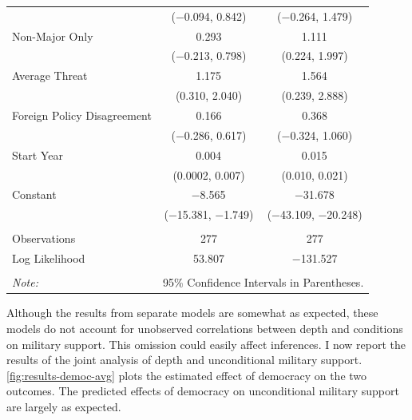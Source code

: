 \documentclass[12pt]{article}
\begin{document}
\begin{table}[!htbp]
\begin{tabular}{@{\extracolsep{5pt}}lcc}
  & ($-$0.094, 0.842) & ($-$0.264, 1.479) \\ 
  Non-Major Only & 0.293 & 1.111$^{}$ \\ 
  & ($-$0.213, 0.798) & (0.224, 1.997) \\ 
  Average Threat & 1.175$^{}$ & 1.564$^{}$ \\ 
  & (0.310, 2.040) & (0.239, 2.888) \\ 
  Foreign Policy Disagreement & 0.166 & 0.368 \\ 
  & ($-$0.286, 0.617) & ($-$0.324, 1.060) \\ 
  Start Year & 0.004$^{}$ & 0.015$^{}$ \\ 
  & (0.0002, 0.007) & (0.010, 0.021) \\ 
  Constant & $-$8.565$^{}$ & $-$31.678$^{}$ \\ 
  & ($-$15.381, $-$1.749) & ($-$43.109, $-$20.248) \\ 
 \hline \\[-1.8ex] 
Observations & 277 & 277 \\ 
Log Likelihood & 53.807 & $-$131.527 \\ 
\hline 
\hline \\[-1.8ex] 
\textit{Note:}  & \multicolumn{2}{r}{95\% Confidence Intervals in Parentheses.} \\ 
\end{tabular} 
\end{table} 

Although the results from separate models are somewhat as expected, these models do not account for unobserved correlations between depth and conditions on military support. 
This omission could easily affect inferences. 
I now report the results of the joint analysis of depth and unconditional military support. 
\autoref{fig:results-democ-avg} plots the estimated effect of democracy on the two outcomes. 
The predicted effects of democracy on unconditional military support are largely as expected. 
\end{document}
